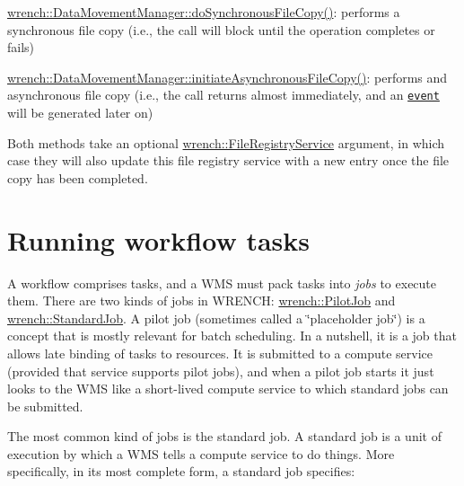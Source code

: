 \begin{DoxyItemize}
\item {\ttfamily \hyperlink{classwrench_1_1_data_movement_manager_a815bf4ed2a32b39c0e46a6f5a3c10e51}{wrench\+::\+Data\+Movement\+Manager\+::do\+Synchronous\+File\+Copy()}}\+: performs a synchronous file copy (i.\+e., the call will block until the operation completes or fails)
\item {\ttfamily \hyperlink{classwrench_1_1_data_movement_manager_a3ddeb9700a10b5f249b91786e6dddcb0}{wrench\+::\+Data\+Movement\+Manager\+::initiate\+Asynchronous\+File\+Copy()}}\+: performs and asynchronous file copy (i.\+e., the call returns almost immediately, and an \href{#wrench-101-WMS-events}{\tt event} will be generated later on)
\end{DoxyItemize}

Both methods take an optional {\ttfamily \hyperlink{classwrench_1_1_file_registry_service}{wrench\+::\+File\+Registry\+Service}} argument, in which case they will also update this file registry service with a new entry once the file copy has been completed.\hypertarget{wrench-101_wrench-101-WMS-tasks}{}\section{Running workflow tasks}\label{wrench-101_wrench-101-WMS-tasks}
A workflow comprises tasks, and a W\+MS must pack tasks into {\itshape jobs} to execute them. There are two kinds of jobs in W\+R\+E\+N\+CH\+: {\ttfamily \hyperlink{classwrench_1_1_pilot_job}{wrench\+::\+Pilot\+Job}} and {\ttfamily \hyperlink{classwrench_1_1_standard_job}{wrench\+::\+Standard\+Job}}. A pilot job (sometimes called a \char`\"{}placeholder job\char`\"{}) is a concept that is mostly relevant for batch scheduling. In a nutshell, it is a job that allows late binding of tasks to resources. It is submitted to a compute service (provided that service supports pilot jobs), and when a pilot job starts it just looks to the W\+MS like a short-\/lived compute service to which standard jobs can be submitted.

The most common kind of jobs is the standard job. A standard job is a unit of execution by which a W\+MS tells a compute service to do things. More specifically, in its most complete form, a standard job specifies\+:


